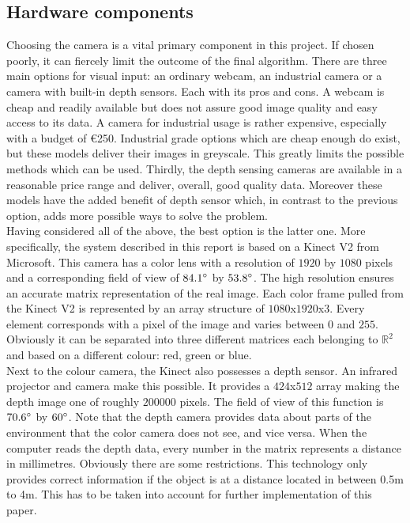 \documentclass{article}
\begin{document}
\subsection{Hardware components}
\noindent Choosing the camera is a vital primary component in this project. If chosen poorly, it can fiercely limit the outcome of the final algorithm. There are three main options for visual input: an ordinary webcam, an industrial camera or a camera with built-in depth sensors. Each with its pros and cons. A webcam is cheap and readily available but does not assure good image quality and easy access to its data. A camera for industrial usage is rather expensive, especially with a budget of \euro 250. Industrial grade options which are cheap enough do exist, but these models deliver their images in greyscale. This greatly limits the possible methods which can be used. Thirdly, the depth sensing cameras are available in a reasonable price range and deliver, overall, good quality data. Moreover these models have the added benefit of depth sensor which, in contrast to the previous option, adds more possible ways to solve the problem.\\

\noindent Having considered all of the above, the best option is the latter one. More specifically, the system described in this report is based on a Kinect V2 from Microsoft. This camera has a color lens with a resolution of $1920$ by $1080$ pixels and a corresponding field of view of $84.1\degree$ by $53.8\degree$\cite{kinect_specifications}. The high resolution ensures an accurate matrix representation of the real image. Each color frame pulled from the Kinect V2 is represented by an array structure of $1080$x$1920$x$3$. Every element corresponds with a pixel of the image and varies between $0$ and $255$. Obviously it can be separated into three different matrices each belonging to $\mathbb{R}^{2}$ and based on a different colour: red, green or blue.\\ Next to the colour camera, the Kinect also possesses a depth sensor. An infrared projector and camera make this possible\cite{kinect_v2}. It provides a $424$x$512$ array making the depth image one of roughly $200 000$ pixels. The field of view of this function is $70.6\degree$ by $60\degree$. Note that the depth camera provides data about parts of the environment that the color camera does not see, and vice versa. When the computer reads the depth data, every number in the matrix represents a distance in millimetres. Obviously there are some restrictions. This technology only provides correct information if the object is at a distance located in between 0.5m to 4m. This has to be taken into account for further implementation of this paper.\\
\end{document}
